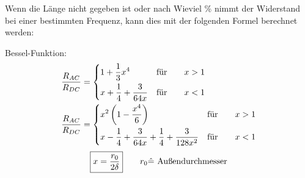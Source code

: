 Wenn die Länge nicht gegeben ist oder nach Wieviel \% nimmt der Widerstand bei
einer bestimmten Frequenz, kann dies mit der folgenden Formel berechnet werden:

\begin{description}
    \item Bessel-Funktion:
          \begin{align*}
              \frac{R_{AC}}{R_{DC}} & =
              \begin{dcases}
                  1 + \frac{1}{3}x^4              & \text{für} \qquad x > 1 \\
                  x + \frac{1}{4} + \frac{3}{64x} & \text{für} \qquad x < 1 \\
              \end{dcases} \\
              \frac{R_{AC}}{R_{DC}} & =
              \begin{dcases}
                  x^2\left( 1-\frac{x^4}{6} \right)                               & \text{für} \qquad x > 1 \\
                  x- \frac{1}{4} + \frac{3}{64x} + \frac{1}{4} + \frac{3}{128x^2} & \text{für} \qquad x < 1 \\
              \end{dcases}
          \end{align*}
          \[
              \boxed{x=\frac{r_0}{2\delta}} \qquad r_0 \hat{=} \textnormal{ Außendurchmesser}
          \]
\end{description}
